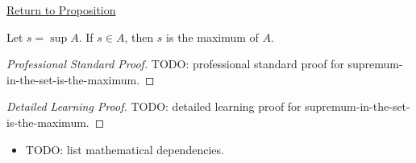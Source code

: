 \newpage
{}
\label{prf:supremum-in-the-set-is-the-maximum}

\begin{remark*}[Return]
\hyperref[prop:supremum-in-the-set-is-the-maximum]{Return to Proposition}
\end{remark*}

\begin{proposition*}
Let $s = \sup A$. If $s \in A$, then $s$ is the maximum of $A$.
\end{proposition*}

\begin{proof}[Professional Standard Proof]
\LRAProofBodyStart
TODO: professional standard proof for supremum-in-the-set-is-the-maximum.
\end{proof}

\begin{proof}[Detailed Learning Proof]
\LRAProofBodyStart
TODO: detailed learning proof for supremum-in-the-set-is-the-maximum.
\end{proof}


\begin{remark*}
\end{remark*}

\begin{dependencies}
\begin{itemize}
  \item TODO: list mathematical dependencies.
\end{itemize}
\end{dependencies}

\clearpage
